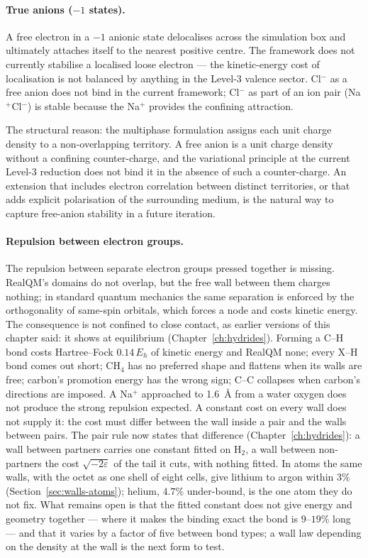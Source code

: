 \paragraph{True anions ($-1$ states).}
A free electron in a $-1$ anionic state delocalises across the simulation box and ultimately attaches itself to the nearest positive centre. The framework does not currently stabilise a localised loose electron --- the kinetic-energy cost of localisation is not balanced by anything in the Level-3 valence sector. Cl$^-$ as a free anion does not bind in the current framework; Cl$^-$ as part of an ion pair (Na$^+$Cl$^-$) is stable because the Na$^+$ provides the confining attraction.

The structural reason: the multiphase formulation assigns each unit charge density to a non-overlapping territory. A free anion is a unit charge density without a confining counter-charge, and the variational principle at the current Level-3 reduction does not bind it in the absence of such a counter-charge. An extension that includes electron correlation between distinct territories, or that adds explicit polarisation of the surrounding medium, is the natural way to capture free-anion stability in a future iteration.

\paragraph{Repulsion between electron groups.}
The repulsion between separate electron groups pressed together is missing. RealQM's domains do not overlap, but the free wall between them charges nothing; in standard quantum mechanics the same separation is enforced by the orthogonality of same-spin orbitals, which forces a node and costs kinetic energy. The consequence is not confined to close contact, as earlier versions of this chapter said: it shows at equilibrium (Chapter~\ref{ch:hydrides}). Forming a C--H bond costs Hartree--Fock $0.14\,E_h$ of kinetic energy and RealQM none; every X--H bond comes out short; CH$_4$ has no preferred shape and flattens when its walls are free; carbon's promotion energy has the wrong sign; C--C collapses when carbon's directions are imposed. A Na$^+$ approached to 1.6~\AA{} from a water oxygen does not produce the strong repulsion expected. A constant cost on every wall does not supply it: the cost must differ between the wall inside a pair and the walls between pairs. The pair rule now states that difference (Chapter~\ref{ch:hydrides}): a wall between partners carries one constant fitted on H$_2$, a wall between non-partners the cost $\sqrt{-2\varepsilon}$ of the tail it cuts, with nothing fitted. In atoms
the same walls, with the octet as one shell of eight cells, give lithium to argon within $3\%$
(Section~\ref{sec:walls-atoms}); helium, $4.7\%$ under-bound, is the one atom they do not fix. What remains open is that the fitted constant does not give energy and geometry together --- where it makes the binding exact the bond is $9$--$19\%$ long --- and that it varies by a factor of five between bond types; a wall law depending on the density at the wall is the next form to test.

